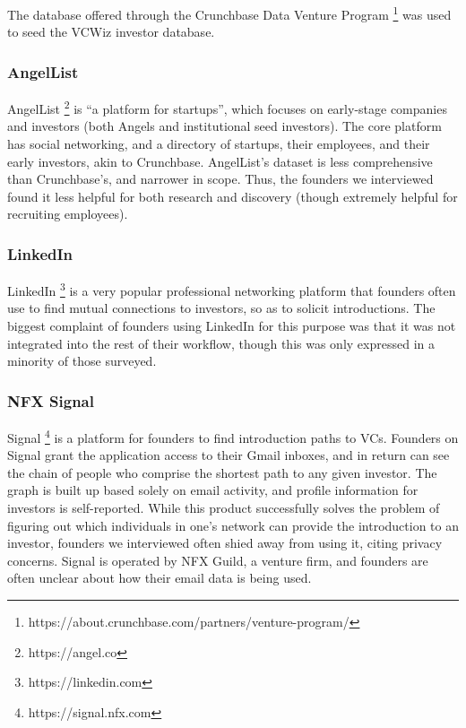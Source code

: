 The database offered through the Crunchbase Data Venture Program \footnote{https://about.crunchbase.com/partners/venture-program/} was used to seed the VCWiz investor database.

\subsubsection{AngelList}

AngelList \footnote{https://angel.co} is ``a platform for startups'', which focuses on early-stage companies and investors (both Angels and institutional seed investors). The core platform has social networking, and a directory of startups, their employees, and their early investors, akin to Crunchbase. AngelList's dataset is less comprehensive than Crunchbase's, and narrower in scope. Thus, the founders we interviewed found it less helpful for both research and discovery (though extremely helpful for recruiting employees).

\subsubsection{LinkedIn}

LinkedIn \footnote{https://linkedin.com} is a very popular professional networking platform that founders often use to find mutual connections to investors, so as to solicit introductions. The biggest complaint of founders using LinkedIn for this purpose was that it was not integrated into the rest of their workflow, though this was only expressed in a minority of those surveyed.

\subsubsection{NFX Signal}

Signal \footnote{https://signal.nfx.com} is a platform for founders to find introduction paths to VCs. Founders on Signal grant the application access to their Gmail inboxes, and in return can see the chain of people who comprise the shortest path to any given investor. The graph is built up based solely on email activity, and profile information for investors is self-reported. While this product successfully solves the problem of figuring out which individuals in one's network can provide the introduction to an investor, founders we interviewed often shied away from using it, citing privacy concerns. Signal is operated by NFX Guild, a venture firm, and founders are often unclear about how their email data is being used.

